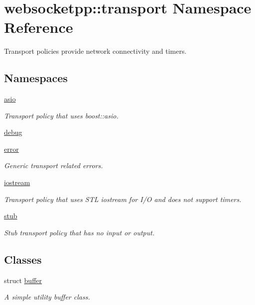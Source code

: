\hypertarget{namespacewebsocketpp_1_1transport}{}\section{websocketpp\+:\+:transport Namespace Reference}
\label{namespacewebsocketpp_1_1transport}


Transport policies provide network connectivity and timers.  


\subsection*{Namespaces}
\begin{DoxyCompactItemize}
\item 
 \hyperlink{namespacewebsocketpp_1_1transport_1_1asio}{asio}
\begin{DoxyCompactList}\small\item\em Transport policy that uses boost\+::asio. \end{DoxyCompactList}\item 
 \hyperlink{namespacewebsocketpp_1_1transport_1_1debug}{debug}
\item 
 \hyperlink{namespacewebsocketpp_1_1transport_1_1error}{error}
\begin{DoxyCompactList}\small\item\em Generic transport related errors. \end{DoxyCompactList}\item 
 \hyperlink{namespacewebsocketpp_1_1transport_1_1iostream}{iostream}
\begin{DoxyCompactList}\small\item\em Transport policy that uses S\+TL iostream for I/O and does not support timers. \end{DoxyCompactList}\item 
 \hyperlink{namespacewebsocketpp_1_1transport_1_1stub}{stub}
\begin{DoxyCompactList}\small\item\em Stub transport policy that has no input or output. \end{DoxyCompactList}\end{DoxyCompactItemize}
\subsection*{Classes}
\begin{DoxyCompactItemize}
\item 
struct \hyperlink{structwebsocketpp_1_1transport_1_1buffer}{buffer}
\begin{DoxyCompactList}\small\item\em A simple utility buffer class. \end{DoxyCompactList}\end{DoxyCompactItemize}
